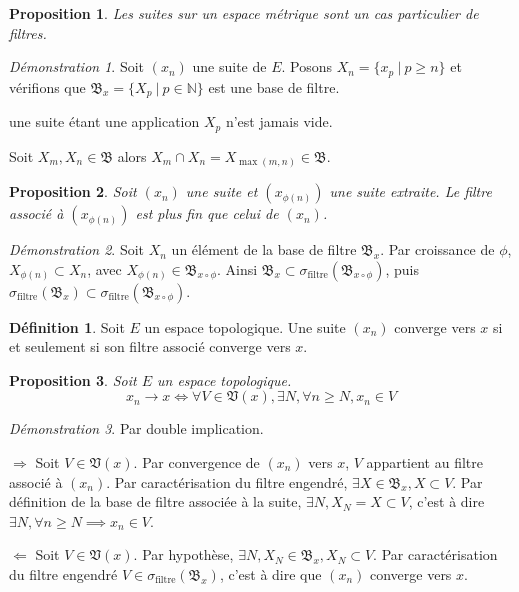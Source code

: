 \documentclass[a4paper, 11pt, french]{book}
\newenvironment{itemise}{\itemize}{\enditemize}
\theoremstyle{plain} %
\newtheorem{proposition}{Proposition}
\theoremstyle{definition} %
\newtheorem{definition}{Définition}
\theoremstyle{remark} %
\newtheorem*{demonstration}{Démonstration}
\newcommand{\1}{\mathds{1}}
\newcommand{\supegal}{\geqslant}
\newcommand{\N}{\mathbb{N}}
\newcommand\ens[2]{\{#1 \ |\ #2\}}
\begin{document}
\begin{proposition}
	Les suites sur un espace métrique sont un cas particulier de filtres.
\end{proposition}

\begin{demonstration}
	Soit $(x_n)$ une suite de $E$.
	Posons $X_n=\ens{x_p}{p\supegal n}$ et vérifions que $\mathfrak{B}_x=\ens{X_p}{p\in\N}$ est une base de filtre.
	\begin{itemise}
		\item une suite étant une application $X_p$ n'est jamais vide.
		\item Soit $X_m, X_n\in\mathfrak{B}$ alors $X_m\cap X_n=X_{\max(m, n)}\in\mathfrak{B}$.
	\end{itemise}
\end{demonstration}

\begin{proposition}
	Soit $(x_n)$ une suite et $(x_{\phi(n)})$ une suite extraite.
	Le filtre associé à $(x_{\phi(n)})$ est plus fin que celui de $(x_n)$.
\end{proposition}

\begin{demonstration}
	Soit $X_n$ un élément de la base de filtre $\mathfrak{B}_x$.
	Par croissance de $\phi$, $X_{\phi(n)}\subset X_n$, avec $X_{\phi(n)}\in\mathfrak{B}_{x\circ\phi}$.
	Ainsi $\mathfrak{B}_x\subset\sigma_\text{filtre}(\mathfrak{B}_{x\circ\phi})$, puis $\sigma_\text{filtre}(\mathfrak{B}_x)\subset\sigma_\text{filtre}(\mathfrak{B}_{x\circ\phi})$.
\end{demonstration}

\begin{definition}
	Soit $E$ un espace topologique.
	Une suite $(x_n)$ converge vers $x$ si et seulement si son filtre associé converge vers $x$.
\end{definition}

\begin{proposition}
	Soit $E$ un espace topologique.
	$$
		x_n\rightarrow x
		\iff
		\forall V\in\mathfrak{V}(x), \exists N, \forall n\supegal N, x_n\in V
	$$
\end{proposition}

\begin{demonstration}
	Par double implication.
	\begin{itemise}
		\item[$\Rightarrow$] Soit $V\in\mathfrak{V}(x)$.
		Par convergence de $(x_n)$ vers $x$, $V$ appartient au filtre associé à $(x_n)$.
		Par caractérisation du filtre engendré, $\exists X\in\mathfrak{B}_x, X\subset V$.
		Par définition de la base de filtre associée à la suite, $\exists N, X_N=X\subset V$, c'est à dire $\exists N, \forall n\supegal N\implies x_n\in V$.
		\item[$\Leftarrow$] Soit $V\in\mathfrak{V}(x)$.
		Par hypothèse, $\exists N, X_N\in\mathfrak{B}_x, X_N\subset V$.
		Par caractérisation du filtre engendré $V\in\sigma_\text{filtre}(\mathfrak{B}_x)$, c'est à dire que $(x_n)$ converge vers $x$.
	\end{itemise}
\end{demonstration}
\end{document}
